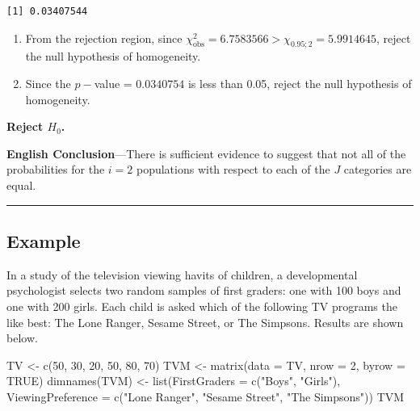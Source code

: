 \documentclass[
]{article}
\newenvironment{Shaded}{\begin{snugshade}}{\end{snugshade}}
\newcommand{\AttributeTok}[1]{\textcolor[rgb]{0.77,0.63,0.00}{#1}}
\newcommand{\ConstantTok}[1]{\textcolor[rgb]{0.00,0.00,0.00}{#1}}
\newcommand{\DecValTok}[1]{\textcolor[rgb]{0.00,0.00,0.81}{#1}}
\newcommand{\FunctionTok}[1]{\textcolor[rgb]{0.00,0.00,0.00}{#1}}
\newcommand{\NormalTok}[1]{#1}
\newcommand{\OtherTok}[1]{\textcolor[rgb]{0.56,0.35,0.01}{#1}}
\newcommand{\StringTok}[1]{\textcolor[rgb]{0.31,0.60,0.02}{#1}}
\begin{document}
\begin{verbatim}
[1] 0.03407544
\end{verbatim}

\begin{enumerate}
\def\labelenumi{\Roman{enumi}.}
\item
  From the rejection region, since \(\chi_{\text{obs}}^2= 6.7583566 > \chi_{0.95;2} = 5.9914645\), reject the null hypothesis of homogeneity.
\item
  Since the \(p-\)value = \(0.0340754\) is less than 0.05,
  reject the null hypothesis of homogeneity.
\end{enumerate}

\textbf{Reject \(H_0\).}

\textbf{English Conclusion}---There is sufficient evidence to suggest that not all of the probabilities for the \(i=2\) populations with respect to each of the \(J\) categories are equal.

\begin{center}\rule{0.5\linewidth}{0.5pt}\end{center}

\hypertarget{example-3}{%
\subsection*{Example}\label{example-3}}

In a study of the television viewing havits of children, a developmental psychologist selects two random samples of first graders: one with 100 boys and one with 200 girls. Each child is asked which of the following TV programs the like best: The Lone Ranger, Sesame Street, or The Simpsons. Results are shown below.

\begin{Shaded}
\begin{Highlighting}[]
\NormalTok{TV }\OtherTok{\textless{}{-}} \FunctionTok{c}\NormalTok{(}\DecValTok{50}\NormalTok{, }\DecValTok{30}\NormalTok{, }\DecValTok{20}\NormalTok{, }\DecValTok{50}\NormalTok{, }\DecValTok{80}\NormalTok{, }\DecValTok{70}\NormalTok{)}
\NormalTok{TVM }\OtherTok{\textless{}{-}} \FunctionTok{matrix}\NormalTok{(}\AttributeTok{data =}\NormalTok{ TV, }\AttributeTok{nrow =} \DecValTok{2}\NormalTok{, }\AttributeTok{byrow =} \ConstantTok{TRUE}\NormalTok{)}
\FunctionTok{dimnames}\NormalTok{(TVM) }\OtherTok{\textless{}{-}} \FunctionTok{list}\NormalTok{(}\AttributeTok{FirstGraders =} \FunctionTok{c}\NormalTok{(}\StringTok{"Boys"}\NormalTok{, }\StringTok{"Girls"}\NormalTok{), }\AttributeTok{ViewingPreference =} \FunctionTok{c}\NormalTok{(}\StringTok{"Lone Ranger"}\NormalTok{, }\StringTok{"Sesame Street"}\NormalTok{, }\StringTok{"The Simpsons"}\NormalTok{))}
\NormalTok{TVM}
\end{Highlighting}
\end{Shaded}
\end{document}

